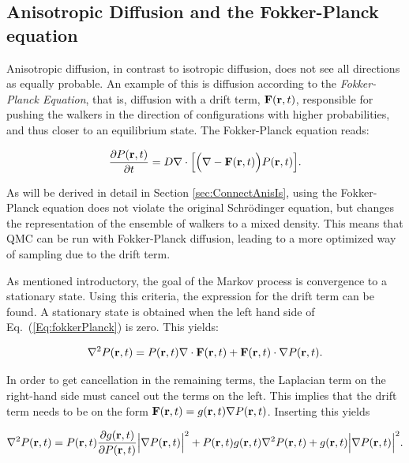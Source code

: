 \subsection{Anisotropic Diffusion and the Fokker-Planck equation}
\label{sec:anisFokker}

Anisotropic diffusion, in contrast to isotropic diffusion, does not see all directions as equally probable. An example of this is diffusion according to the \textit{Fokker-Planck Equation}, that is, diffusion with a drift term, $\mathbf{F}(\mathbf{r}, t)$, responsible for pushing the walkers in the direction of configurations with higher probabilities, and thus closer to an equilibrium state. The Fokker-Planck equation reads:

\begin{equation}
 \label{Eq:fokkerPlanck}
 \frac{\partial P(\mathbf{r}, t)}{\partial t} = D\nabla\cdot\Big[\Big(\nabla - \mathbf{F}(\mathbf{r}, t)\Big) P(\mathbf{r}, t)\Big] .
\end{equation}

As will be derived in detail in Section \ref{sec:ConnectAnisIs}, using the Fokker-Planck equation does not violate the original Schrödinger equation, but changes the representation of the ensemble of walkers to a mixed density. This means that QMC can be run with Fokker-Planck diffusion, leading to a more optimized way of sampling due to the drift term. 

As mentioned introductory, the goal of the Markov process is convergence to a stationary state. Using this criteria, the expression for the drift term can be found. A stationary state is obtained when the left hand side of Eq.~(\ref{Eq:fokkerPlanck}) is zero. This yields:

\begin{equation*}
 \nabla^2 P(\mathbf{r}, t) = P(\mathbf{r}, t)\nabla\cdot\mathbf{ F}(\mathbf{ r}, t) + \mathbf{ F}(\mathbf{ r}, t) \cdot \nabla P(\mathbf{ r}, t).
\end{equation*}

In order to get cancellation in the remaining terms, the Laplacian term on the right-hand side must cancel out the terms on the left. This implies that the drift term needs to be on the form $\mathbf{F}(\mathbf{ r}, t) = g(\mathbf{ r}, t)\nabla P(\mathbf{ r}, t)$. Inserting this yields

\begin{equation*}
  \nabla^2 P(\mathbf{ r}, t) = P(\mathbf{ r}, t)\frac{\partial g(\mathbf{ r}, t)}{\partial P(\mathbf{ r}, t)}\Big|\nabla P(\mathbf{ r}, t)\Big|^2
  + P(\mathbf{ r}, t)g(\mathbf{ r}, t)\nabla^2 P(\mathbf{ r}, t) + g(\mathbf{ r}, t) \Big|\nabla P(\mathbf{ r}, t)\Big|^2.
\end{equation*}

